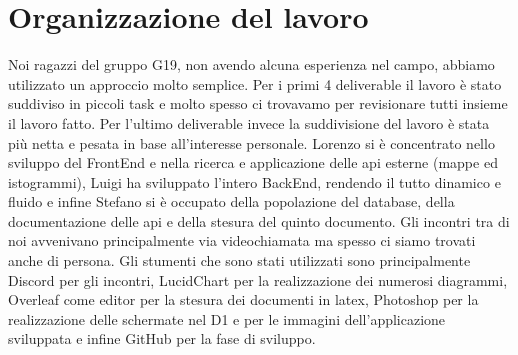 \section{Organizzazione del lavoro}

Noi ragazzi del gruppo G19, non avendo alcuna esperienza nel campo, abbiamo utilizzato un approccio molto semplice.
Per i primi 4 deliverable il lavoro è stato suddiviso in piccoli task e molto spesso ci trovavamo per revisionare tutti insieme il lavoro fatto.
Per l'ultimo deliverable invece la suddivisione del lavoro è stata più netta e pesata in base all'interesse personale. Lorenzo si è concentrato nello sviluppo del FrontEnd e nella ricerca e applicazione delle api esterne (mappe ed istogrammi), Luigi ha sviluppato l'intero BackEnd, rendendo il tutto dinamico e fluido e infine Stefano si è occupato della popolazione del database, della documentazione delle api e della stesura del quinto documento.
Gli incontri tra di noi avvenivano principalmente via videochiamata ma spesso ci siamo trovati anche di persona.
Gli stumenti che sono stati utilizzati sono principalmente Discord per gli incontri, LucidChart per la realizzazione dei numerosi diagrammi, Overleaf come editor per la stesura dei documenti in latex, Photoshop per la realizzazione delle schermate nel D1 e per le immagini dell'applicazione sviluppata e infine GitHub per la fase di sviluppo.